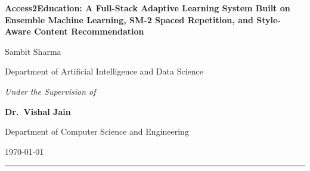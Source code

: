 \documentclass[12pt,a4paper]{article}
\begin{document}
\begin{titlepage}
    \centering
    \vspace*{2cm}
    {\LARGE\bfseries Access2Education: A Full-Stack Adaptive Learning
    System Built on Ensemble Machine Learning, SM-2 Spaced
    Repetition, and Style-Aware Content Recommendation\par}
    \vspace{1.5cm}
    {\large Sambit Sharma\par}
    \vspace{0.3cm}
    {\normalsize Department of Artificial Intelligence and Data Science\par}
    \vspace{0.6cm}
    {\normalsize\textit{Under the Supervision of}\par}
    \vspace{0.2cm}
    {\large\bfseries Dr.\ Vishal Jain\par}
    \vspace{0.1cm}
    {\normalsize Department of Computer Science and Engineering\par}
    \vspace{0.6cm}
    {\normalsize \today\par}
    \vfill
    \rule{0.8\linewidth}{0.4pt}
\end{titlepage}
\end{document}
